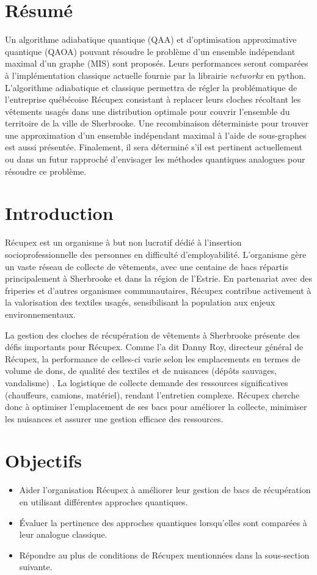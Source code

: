 \documentclass[11pt]{article}
\begin{document}

\setcounter{figure}{0}
\tableofcontents
\newpage
\section*{Résumé}
Un algorithme adiabatique quantique (QAA) et d'optimisation approximative quantique (QAOA) pouvant résoudre le problème d'un ensemble indépendant maximal d'un graphe (MIS) sont proposés. Leurs performances seront comparées à l'implémentation classique actuelle fournie par la librairie \textit{networkx} en python. L'algorithme adiabatique et classique permettra de régler la problématique de l'entreprise québécoise Récupex consistant à replacer leurs cloches récoltant les vêtements usagés dans une distribution optimale pour couvrir l'ensemble du territoire de la ville de Sherbrooke. Une recombinaison déterministe pour trouver une approximation d'un ensemble indépendant maximal à l'aide de sous-graphes est aussi présentée. Finalement, il sera déterminé s'il est pertinent actuellement ou dans un futur rapproché d'envisager les méthodes quantiques analogues pour résoudre ce problème.

\section{Introduction}
Récupex est un organisme à but non lucratif dédié à l’insertion socioprofessionnelle des personnes en difficulté d’employabilité. L’organisme gère un vaste réseau de collecte de vêtements, avec une centaine de bacs répartis principalement à Sherbrooke et dans la région de l’Estrie. En partenariat avec des friperies et d’autres organismes communautaires, Récupex contribue activement à la valorisation des textiles usagés, sensibilisant la population aux enjeux environnementaux.

La gestion des cloches de récupération de vêtements à Sherbrooke présente des défis importants pour Récupex. Comme l'a dit Danny Roy, directeur général de Récupex, la performance de celles-ci varie selon les emplacements en termes de volume de dons, de qualité des textiles et de nuisances (dépôts sauvages, vandalisme) \cite{noauthor_recupex_nodate}. La logistique de collecte demande des ressources significatives (chauffeurs, camions, matériel), rendant l'entretien complexe. Récupex cherche donc à optimiser l'emplacement de ses bacs pour améliorer la collecte, minimiser les nuisances et assurer une gestion efficace des ressources.

\section{Objectifs}
\begin{itemize}
    \item Aider l'organisation Récupex à améliorer leur gestion de bacs de récupération en utilisant différentes approches quantiques.
\item Évaluer la pertinence des approches quantiques lorsqu’elles sont comparées à leur analogue classique.
\item Répondre au plus de conditions de Récupex mentionnées dans la sous-section suivante.
\end{itemize}
\end{document}
